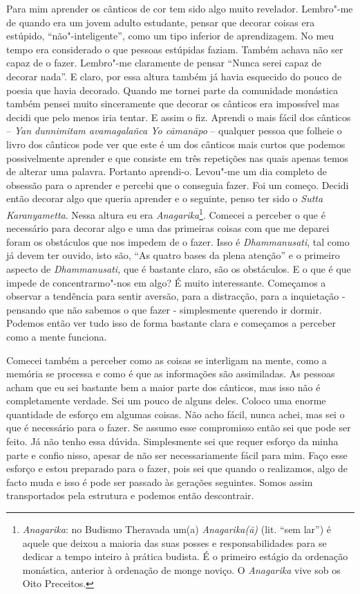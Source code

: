 Para mim aprender os cânticos de cor tem sido algo muito revelador.
Lembro"-me de quando era um jovem adulto estudante, pensar que decorar
coisas era estúpido, ``não"-inteligente'', como um tipo inferior de
aprendizagem. No meu tempo era considerado o que pessoas estúpidas
faziam. Também achava não ser capaz de o fazer. Lembro"-me claramente de
pensar ``Nunca serei capaz de decorar nada''. E claro, por essa altura
também já havia esquecido do pouco de poesia que havia decorado. Quando
me tornei parte da comunidade monástica também pensei muito sinceramente
que decorar os cânticos era impossível mas decidi que pelo menos iria
tentar. E assim o fiz. Aprendi o mais fácil dos cânticos -- \emph{Yan
dunnimitam avamagalañca Yo cāmanāpo} -- qualquer pessoa que folheie o
livro dos cânticos pode ver que este é um dos cânticos mais curtos que
podemos possivelmente aprender e que consiste em três repetições nas
quais apenas temos de alterar uma palavra. Portanto aprendi-o. Levou"-me
um dia completo de obsessão para o aprender e percebi que o conseguia
fazer. Foi um começo. Decidi então decorar algo que queria aprender e o
seguinte, penso ter sido o \emph{Sutta Karanyametta}. Nessa altura eu
era \emph{Anagarika}\footnote{%
  \emph{Anagarika}: no Budismo Theravada um(a) \emph{Anagarika(ā)}
  (lit. ``sem lar'') é aquele que deixou a maioria das suas posses e
  responsabilidades para se dedicar a tempo inteiro à prática budista. É o
  primeiro estágio da ordenação monástica, anterior à ordenação de monge
  noviço. O \emph{Anagarika} vive sob os Oito Preceitos.
}.
Comecei a perceber o que é necessário para
decorar algo e uma das primeiras coisas com que me deparei foram os
obstáculos que nos impedem de o fazer. Isso é \emph{Dhammanusati}, tal
como já devem ter ouvido, isto são, ``As quatro bases da plena atenção''
e o primeiro aspecto de \emph{Dhammanusati,} que é bastante claro, são
os obstáculos. E o que é que impede de concentrarmo"-nos em algo? É muito
interessante. Começamos a observar a tendência para sentir aversão, para
a distracção, para a inquietação - pensando que não sabemos o que fazer
- simplesmente querendo ir dormir. Podemos então ver tudo isso de forma
bastante clara e começamos a perceber como a mente funciona.

Comecei também a perceber como as coisas se interligam na mente, como a
memória se processa e como é que as informações são assimiladas. As
pessoas acham que eu sei bastante bem a maior parte dos cânticos, mas
isso não é completamente verdade. Sei um pouco de alguns deles. Coloco
uma enorme quantidade de esforço em algumas coisas. Não acho fácil,
nunca achei, mas sei o que é necessário para o fazer. Se assumo esse
compromisso então sei que pode ser feito. Já não tenho essa dúvida.
Simplesmente sei que requer esforço da minha parte e confio nisso,
apesar de não ser necessariamente fácil para mim. Faço esse esforço e
estou preparado para o fazer, pois sei que quando o realizamos, algo de
facto muda e isso é pode ser passado às gerações seguintes. Somos assim
transportados pela estrutura e podemos então descontrair.

